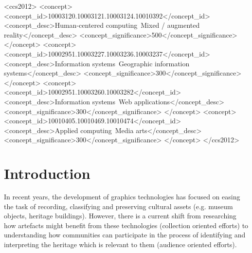 \documentclass[acmlarge,screen,dvipsnames]{acmart}
\begin{document}
\begin{CCSXML} <ccs2012> <concept>
<concept_id>10003120.10003121.10003124.10010392</concept_id>
<concept_desc>Human-centered computing~Mixed / augmented
reality</concept_desc> <concept_significance>500</concept_significance>
</concept> <concept>
<concept_id>10002951.10003227.10003236.10003237</concept_id>
<concept_desc>Information systems~Geographic information
systems</concept_desc> <concept_significance>300</concept_significance>
</concept> <concept> <concept_id>10002951.10003260.10003282</concept_id>
<concept_desc>Information systems~Web applications</concept_desc>
<concept_significance>300</concept_significance> </concept> <concept>
<concept_id>10010405.10010469.10010474</concept_id> <concept_desc>Applied
computing~Media arts</concept_desc>
<concept_significance>300</concept_significance> </concept> </ccs2012>
\end{CCSXML}

  

\maketitle
\section{Introduction} In recent years, the development of graphics
technologies has focused on easing the task of recording, classifying and
preserving cultural assets (e.g. museum objects, heritage buildings). However,
there is a current shift from researching how artefacts might benefit from these technologies (collection oriented efforts) to understanding how communities can
participate in the process of identifying and interpreting the heritage which is relevant to them (audience oriented efforts). 



\end{document}
